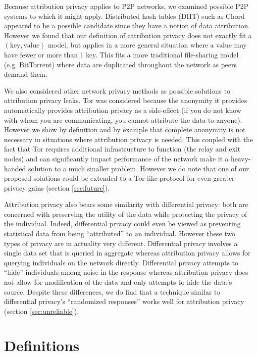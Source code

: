 \documentclass{article}
\newcommand{\secref}[1]{section \ref{sec:#1}}
\begin{document}
Because attribution privacy applies to P2P networks, we examined possible P2P
systems to which it might apply. Distributed hash tables (DHT) such as
Chord\cite{chord} appeared to be a possible candidate since they have a notion
of data attribution. However we found that our definition of attribution privacy
does not exactly fit a $(\text{key},\text{value})$ model, but applies in a more
general situation where a value may have fewer or more than 1 key. This fits a
more traditional file-sharing model (e.g. BitTorrent) where data are duplicated
throughout the network as peers demand them.

We also considered other network privacy methods as possible solutions to
attribution privacy leaks. Tor was considered because the anonymity it provides
automatically provides attribution privacy as a side-effect (if you do not know
with whom you are communicating, you cannot attribute the data to anyone).
However we show by definition and by example that complete anonymity is not
necessary in situations where attribution privacy is needed. This coupled with
the fact that Tor requires additional infrastructure to function (the relay and
exit nodes) and can significantly impact performance of the network make it a
heavy-handed solution to a much smaller problem. However we do note that one of
our proposed solutions could be extended to a Tor-like protocol for even greater
privacy gains (\secref{future}).

Attribution privacy also bears some similarity with differential privacy: both
are concerned with preserving the utility of the data while protecting the
privacy of the individual. Indeed, differential privacy could even be viewed as
preventing statistical data from being ``attributed'' to an individual. However
these two types of privacy are in actuality very different. Differential
privacy involves a single data set that is queried in aggregate whereas attribution
privacy allows for querying individuals on the network directly. Differential
privacy attempts to ``hide'' individuals among noise in the response whereas
attribution privacy does not allow for modification of the data and only
attempts to hide the data's source. Despite these differences, we do find that a
technique similar to differential privacy's ``randomized
responses''\cite{randresps} works well
for attribution privacy (\secref{unreliable}).

\section{Definitions}\label{sec:defn}
\end{document}
